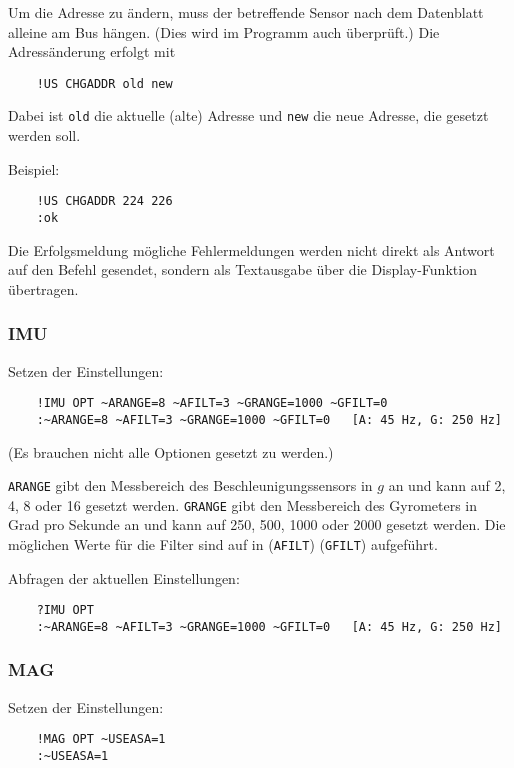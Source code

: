 Um die Adresse zu ändern, muss der betreffende Sensor nach dem Datenblatt alleine am Bus hängen. (Dies wird im Programm auch überprüft.) Die Adressänderung erfolgt mit
\begin{verbatim}
	!US CHGADDR old new
\end{verbatim}
Dabei ist \verb|old| die aktuelle (alte) Adresse und \verb|new| die neue Adresse, die gesetzt werden soll.

Beispiel:
\begin{verbatim}
	!US CHGADDR 224 226
	:ok
\end{verbatim}

Die Erfolgsmeldung \bzw mögliche Fehlermeldungen werden nicht direkt als Antwort auf den Befehl gesendet, sondern als Textausgabe über die Display-Funktion übertragen.


\subsubsection{IMU}

Setzen der Einstellungen:
\begin{verbatim}
	!IMU OPT ~ARANGE=8 ~AFILT=3 ~GRANGE=1000 ~GFILT=0
	:~ARANGE=8 ~AFILT=3 ~GRANGE=1000 ~GFILT=0   [A: 45 Hz, G: 250 Hz]
\end{verbatim}
(Es brauchen nicht alle Optionen gesetzt zu werden.)

\verb|ARANGE| gibt den Messbereich des Beschleunigungssensors in $g$ an und kann auf 2, 4, 8 oder 16 gesetzt werden. \verb|GRANGE| gibt den Messbereich des Gyrometers in Grad pro Sekunde an und kann auf 250, 500, 1000 oder 2000 gesetzt werden. Die möglichen Werte für die Filter sind auf  in  (\verb|AFILT|) \bzw {} (\verb|GFILT|) aufgeführt.


Abfragen der aktuellen Einstellungen:
\begin{verbatim}
	?IMU OPT
	:~ARANGE=8 ~AFILT=3 ~GRANGE=1000 ~GFILT=0   [A: 45 Hz, G: 250 Hz]
\end{verbatim}




\subsubsection{MAG}

Setzen der Einstellungen:
\begin{verbatim}
	!MAG OPT ~USEASA=1
	:~USEASA=1
\end{verbatim}

